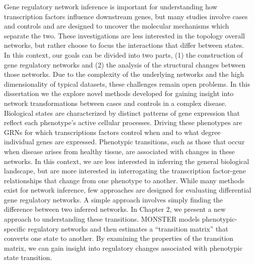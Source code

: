 Gene regulatory network inference is important for understanding how transcription factors influence downstream genes, but many studies involve cases and controls and are designed to uncover the molecular mechanisms which separate the two. These investigations are less interested in the topology overall networks, but rather choose to focus the interactions that differ between states. In this context, our goals can be divided into two parts, (1) the construction of gene regulatory networks and (2) the analysis of the structural changes between those networks. Due to the complexity of the underlying networks and the high dimensionality of typical datasets, these challenges remain open problems. In this dissertation we the explore novel methods developed for gaining insight into network transformations between cases and controls in a complex disease.
Biological states are characterized by distinct patterns of gene expression that reflect each phenotype's active cellular processes. Driving these phenotypes are GRNs for which transcriptions factors control when and to what degree individual genes are expressed. Phenotypic transitions, such as those that occur when disease arises from healthy tissue, are associated with changes in these networks. In this context, we are less interested in inferring the general biological landscape, but are more interested in interrogating the transcription factor-gene relationships that change from one phenotype to another. While many methods exist for network inference, few approaches are designed for evaluating differential gene regulatory networks.  A simple approach involves simply finding the difference between two inferred networks. In Chapter 2, we present a new approach to understanding these transitions. MONSTER models phenotypic-specific regulatory networks and then estimates a ``transition matrix'' that converts one state to another. By examining the properties of the transition matrix, we can gain insight into regulatory changes associated with phenotypic state transition.
